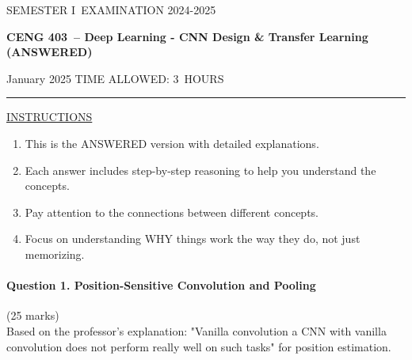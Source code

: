 \documentclass[12pt]{article}
\newcommand{\masunitnumber}{CENG 403}
\newcommand{\examdate}{January 2025}
\newcommand{\academicyear}{2024-2025}
\newcommand{\semester}{I}
\newcommand{\coursename}{Deep Learning - CNN Design \& Transfer Learning (ANSWERED)}
\newcommand{\numberofhours}{3}
\begin{document}
\setlength{\headsep}{5truemm}
\setlength{\headheight}{14.5truemm}
\setlength{\voffset}{-0.45truein}
\renewcommand{\headrulewidth}{0.0pt}
\begin{center}
SEMESTER \semester\ EXAMINATION \academicyear
\end{center}
\begin{center}
{\bf \masunitnumber\ -- \coursename}
\end{center}
\vspace{20truemm}
\noindent \examdate\hspace{45truemm} TIME ALLOWED: \numberofhours\ HOURS
\vspace{19truemm}
\hrule
\vspace{19truemm}
\noindent\underline{INSTRUCTIONS}
\vspace{8truemm}
\begin{enumerate}
\item This is the ANSWERED version with detailed explanations.
\item Each answer includes step-by-step reasoning to help you understand the concepts.
\item Pay attention to the connections between different concepts.
\item Focus on understanding WHY things work the way they do, not just memorizing.
\end{enumerate}

\newpage
\lhead{}
\rhead{\masunitnumber}
\chead{}
\lfoot{}
\cfoot{\thepage}
\rfoot{}
\setlength{\footskip}{45pt}


\paragraph{Question 1. Position-Sensitive Convolution and Pooling}{\hfill (25 marks)}\\
Based on the professor's explanation: "Vanilla convolution a CNN with vanilla convolution does not perform really well on such tasks" for position estimation.
\end{document}
